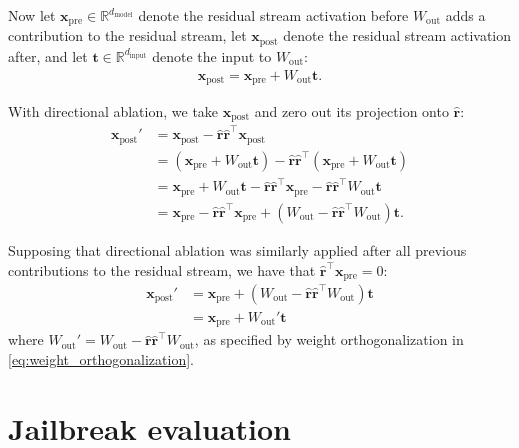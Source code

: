 \documentclass{article}
\begin{document}
Now let $\mathbf{x}_{\text{pre}} \in \mathbb{R}^{d_{\text{model}}}$ denote the residual stream activation before $W_{\text{out}}$ adds a contribution to the residual stream, let $\mathbf{x}_{\text{post}}$ denote the residual stream activation after, and let $\mathbf{t} \in \mathbb{R}^{d_{\text{input}}}$ denote the input to $W_{\text{out}}$:
\begin{align}
\mathbf{x}_{\text{post}} = \mathbf{x}_{\text{pre}} + W_{\text{out}}\mathbf{t}.
\end{align}

With directional ablation, we take $\mathbf{x}_{\text{post}}$ and zero out its projection onto $\hat{\mathbf{r}}$:
\begin{align}
\mathbf{x}_{\text{post}}' &= \mathbf{x}_{\text{post}} - \hat{\mathbf{r}} \hat{\mathbf{r}}^{\intercal} \mathbf{x}_{\text{post}} \\
& = (\mathbf{x}_{\text{pre}} + W_{\text{out}}\mathbf{t}) - \hat{\mathbf{r}} \hat{\mathbf{r}}^{\intercal}(\mathbf{x}_{\text{pre}} + W_{\text{out}}\mathbf{t}) \\
& = \mathbf{x}_{\text{pre}} + W_{\text{out}}\mathbf{t} - \hat{\mathbf{r}} \hat{\mathbf{r}}^{\intercal}\mathbf{x}_{\text{pre}} - \hat{\mathbf{r}} \hat{\mathbf{r}}^{\intercal}W_{\text{out}}\mathbf{t} \\
& = \mathbf{x}_{\text{pre}} - \hat{\mathbf{r}} \hat{\mathbf{r}}^{\intercal}\mathbf{x}_{\text{pre}} + (W_{\text{out}} - \hat{\mathbf{r}} \hat{\mathbf{r}}^{\intercal} W_{\text{out}})\mathbf{t}.
\end{align}

Supposing that directional ablation was similarly applied after all previous contributions to the residual stream, we have that $\hat{\mathbf{r}}^{\intercal}\mathbf{x}_{\text{pre}} = 0$:
\begin{align}
\mathbf{x}_{\text{post}}' & = \mathbf{x}_{\text{pre}} + (W_{\text{out}} - \hat{\mathbf{r}} \hat{\mathbf{r}}^{\intercal} W_{\text{out}})\mathbf{t} \\
 & = \mathbf{x}_{\text{pre}} + W_{\text{out}}' \mathbf{t}
\end{align}
where $W_{\text{out}}' = W_{\text{out}} - \hat{\mathbf{r}} \hat{\mathbf{r}}^{\intercal} W_{\text{out}}$, as specified by weight orthogonalization in \autoref{eq:weight_orthogonalization}.

\clearpage
\section{Jailbreak evaluation}
\label{appendix_jailbreak_evaluation_details}
\end{document}
